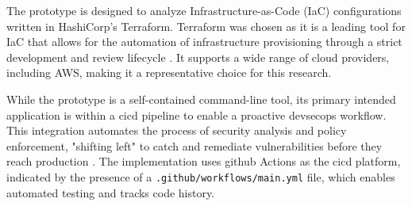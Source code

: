 The prototype is designed to analyze Infrastructure-as-Code (IaC) configurations written in HashiCorp's Terraform. Terraform was chosen as it is a leading tool for IaC that allows for the automation of infrastructure provisioning through a strict development and review lifecycle \cite{howard_terraform_2022-1}. It supports a wide range of cloud providers, including AWS, making it a representative choice for this research.

While the prototype is a self-contained command-line tool, its primary intended application is within a \gls{cicd} pipeline to enable a proactive \gls{devsecops} workflow. This integration automates the process of security analysis and policy enforcement, "shifting left" to catch and remediate vulnerabilities before they reach production \cite{delicheh_mitigating_2024}. The implementation uses \gls{github} Actions as the \gls{cicd} platform, indicated by the presence of a \texttt{.github/workflows/main.yml} file, which enables automated testing and tracks code history.

